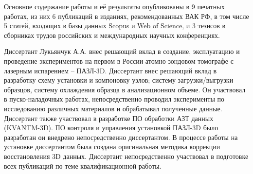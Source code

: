 Основное содержание работы и её результаты опубликованы в 9 печатных работах, из них 6 публикаций в изданиях, рекомендованных ВАК РФ, в том числе 5 статей, входящих в базы данных Scopus и Web of Science, и 3 тезисов в сборниках трудов российских и международных научных конференциях.

{\contribution} Диссертант Лукьянчук А.А. внес решающий вклад в создание, эксплуатацию и проведение экспериментов на первом в России атомно-зондовом томографе с лазерным испарением – ПАЗЛ-3D. Диссертант внес решающий вклад в разработку схему установки и компоновку узлов; систему загрузки/выгрузки образцов, систему охлаждения образца в анализационном объеме. Он участвовал в  пуско-наладочных работах, непосредственно проводил эксперименты по исследованию различных материалов и обрабатывал полученные данные. Диссертант также участвовал в разработке ПО обработки АЗТ данных (KVANTM-3D). ПО контроля и управления установкой ПАЗЛ-3D было разработан ои внедрено непосредственно диссертантом. В процессе работы на установке диссертантом была создана оригинальная методика коррекции восстановления 3D данных. Диссертант непосредственно участвовал в подготовке всех публикаций по теме квалификационной работы.










